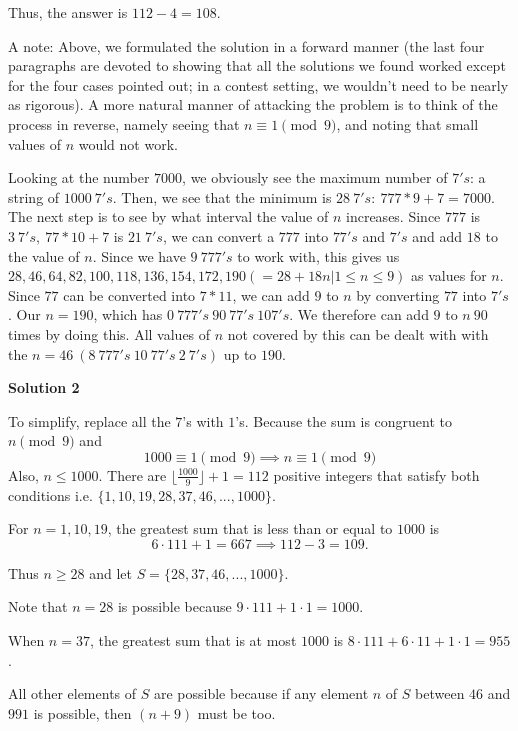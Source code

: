 \begin{enumerate}
 Thus, the answer is $112 - 4 = \boxed{108}$.

 


 A note: Above, we formulated the solution in a forward manner (the last four paragraphs are devoted to showing that all the solutions we found worked except for the four cases pointed out; in a contest setting, we wouldn't need to be nearly as rigorous). A more natural manner of attacking the problem is to think of the process in reverse, namely seeing that $n \equiv 1 \pmod{9}$, and noting that small values of $n$ would not work.  

 Looking at the number $7000$, we obviously see the maximum number of $7's$: a string of $1000 \ 7's$.  Then, we see that the minimum is $28 \ 7's: \ 777*9 + 7 = 7000$.  The next step is to see by what interval the value of $n$ increases.  Since $777$ is $3 \ 7's, \ 77*10 + 7$ is $21 \ 7's$, we can convert a $777$ into $77's$ and $7's$ and add $18$ to the value of $n$.  Since we have $9 \ 777's$ to work with, this gives us $28,46,64,82,100,118,136,154,172,190 ( = 28 + 18n | 1\leq n\leq 9)$ as values for $n$.  Since $77$ can be converted into $7*11$, we can add $9$ to $n$ by converting $77$ into $7's$.  Our $n = 190$, which has $0 \ 777's \ 90 \ 77's \ 10 7's$.  We therefore can add $9$ to $n \ 90$ times by doing this.  All values of $n$ not covered by this can be dealt with with the $n = 46 \ (8 \ 777's \ 10 \ 77's \ 2 \ 7's)$ up to $190$.

 



\textbf{Solution 2}

To simplify, replace all the $7$’s with $1$’s. Because the sum is congruent to $n \pmod 9$ and 
 \[1000 \equiv 1 \pmod 9 \implies n \equiv 1 \pmod 9\]Also, $n \leq 1000$. There are $\big\lfloor \frac{1000}{9} \big\rfloor + 1 = 112$ positive integers that satisfy both conditions i.e. $\{1, 10, 19, 28, 37, 46, . . . , 1000\}.$ 

 For $n = 1, 10, 19$, the greatest sum that is less than or equal to $1000$ is 
 \[6 \cdot 111 + 1 = 667 \implies 112-3 = 109.\]

 Thus $n \geq 28$ and let $S = \{28, 37, 46, . . . , 1000\}$.

 Note that $n=28$ is possible because $9 \cdot 111+1 \cdot 1 = 1000$.

 When $n = 37$, the greatest sum that is at most $1000$ is $8 \cdot 111+6\cdot 11+1 \cdot 1 = 955$. 

 
All other elements of $S$ are possible because if any element $n$ of $S$ between $46$ and $991$ is possible, then $(n+ 9)$ must be too. 


\end{enumerate}
